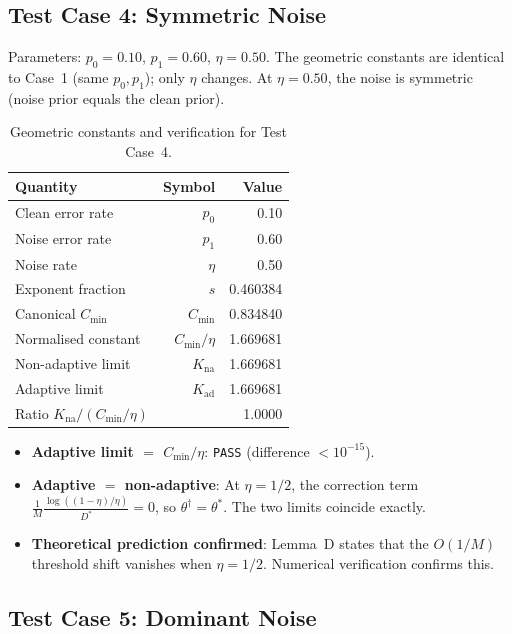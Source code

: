 \subsection{Test Case 4: Symmetric Noise}

Parameters: $p_0 = 0.10$, $p_1 = 0.60$, $\eta = 0.50$. The geometric constants are identical to Case~1 (same $p_0, p_1$); only $\eta$ changes. At $\eta = 0.50$, the noise is symmetric (noise prior equals the clean prior).

\begin{table}[htbp]
\centering
\caption{Geometric constants and verification for Test Case~4.}
\label{tab:case4}
\begin{tabular}{lrr}
\toprule
Quantity & Symbol & Value \\
\midrule
Clean error rate & $p_0$ & 0.10 \\
Noise error rate & $p_1$ & 0.60 \\
Noise rate & $\eta$ & 0.50 \\
Exponent fraction & $s$ & 0.460384 \\
\midrule
Canonical $C_{\min}$ & $C_{\min}$ & 0.834840 \\
Normalised constant & $C_{\min}/\eta$ & 1.669681 \\
Non-adaptive limit & $K_{\mathrm{na}}$ & 1.669681 \\
Adaptive limit & $K_{\mathrm{ad}}$ & 1.669681 \\
Ratio $K_{\mathrm{na}} / (C_{\min}/\eta)$ & & 1.0000 \\
\bottomrule
\end{tabular}
\end{table}

\begin{itemize}
    \item\textbf{Adaptive limit $=$ $C_{\min}/\eta$}: \texttt{PASS} (difference $< 10^{-15}$).
    \item\textbf{Adaptive $=$ non-adaptive}: At $\eta = 1/2$, the correction term $\frac{1}{M}\frac{\log((1-\eta)/\eta)}{D^*} = 0$, so $\theta^\dagger = \theta^*$. The two limits coincide exactly.
    \item\textbf{Theoretical prediction confirmed}: Lemma~D states that the $O(1/M)$ threshold shift vanishes when $\eta = 1/2$. Numerical verification confirms this.
\end{itemize}

\subsection{Test Case 5: Dominant Noise}


